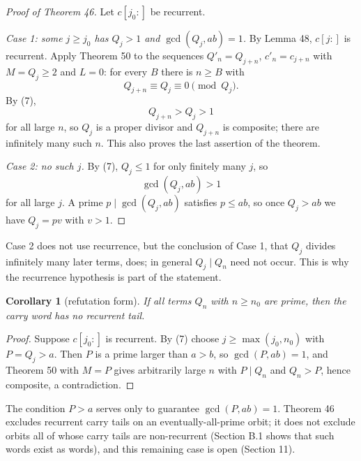 \documentclass[11pt,reqno]{amsart}
\newtheorem{corollary}[theorem]{Corollary}
\theoremstyle{definition}
\theoremstyle{remark}
\begin{document}
\begin{proof}[Proof of Theorem 46]\leavevmode\label{proof:46}
Let \(c[j_0:]\) be recurrent.

\emph{Case 1: some \(j\ge j_0\) has \(Q_j>1\) and \(\gcd(Q_j,ab)=1\).} By
Lemma 48, \(c[j:]\) is recurrent. Apply Theorem 50 to the sequences
\(Q'_n=Q_{j+n}\), \(c'_n=c_{j+n}\) with \(M=Q_j\ge2\) and \(L=0\): for
every \(B\) there is \(n\ge B\) with
\[
Q_{j+n}\equiv Q_j\equiv0\pmod{Q_j}.
\]
By (7),
\[
Q_{j+n}>Q_j>1
\]
for
all large \(n\), so \(Q_j\) is a proper divisor and \(Q_{j+n}\) is
composite; there are infinitely many such \(n\). This also proves the
last assertion of the theorem.

\emph{Case 2: no such \(j\).} By (7), \(Q_j\le1\) for only finitely many
\(j\), so
\[
\gcd(Q_j,ab)>1
\]
for all large \(j\). A prime
\(p\mid\gcd(Q_j,ab)\) satisfies \(p\le ab\), so once \(Q_j>ab\) we have
\(Q_j=pv\) with \(v>1\). \qedhere
\end{proof}

Case 2 does not use recurrence, but the conclusion of Case 1, that
\(Q_j\) divides infinitely many later terms, does; in general
\(Q_j\mid Q_n\) need not occur. This is why the recurrence hypothesis is
part of the statement.

\begin{samepage}
\begin{corollary}[refutation form]\leavevmode\label{thm:51}
If all terms \(Q_n\) with
\(n\ge n_0\) are prime, then the carry word has no recurrent tail.
\label{thm-end:51}
\end{corollary}
\end{samepage}

\begin{proof}\leavevmode\label{proof:51}
Suppose \(c[j_0:]\) is recurrent. By (7) choose
\(j\ge\max(j_0,n_0)\) with \(P=Q_j>a\). Then \(P\) is a prime larger
than \(a>b\), so \(\gcd(P,ab)=1\), and Theorem 50 with \(M=P\) gives
arbitrarily large \(n\) with \(P\mid Q_n\) and \(Q_n>P\), hence
composite, a contradiction. \qedhere
\end{proof}

The condition \(P>a\) serves only to guarantee \(\gcd(P,ab)=1\).
Theorem 46 excludes recurrent carry tails on an eventually-all-prime
orbit; it does not exclude orbits all of whose carry tails are
non-recurrent (Section B.1 shows that such words exist as words), and
this remaining case is open (Section 11).
\end{document}
